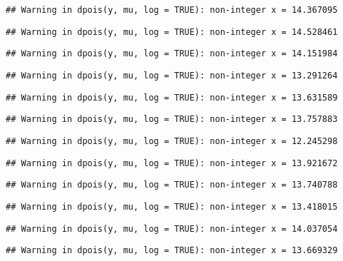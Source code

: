 \documentclass[
]{article}
\begin{document}
\begin{verbatim}
## Warning in dpois(y, mu, log = TRUE): non-integer x = 14.367095
\end{verbatim}

\begin{verbatim}
## Warning in dpois(y, mu, log = TRUE): non-integer x = 14.528461
\end{verbatim}

\begin{verbatim}
## Warning in dpois(y, mu, log = TRUE): non-integer x = 14.151984
\end{verbatim}

\begin{verbatim}
## Warning in dpois(y, mu, log = TRUE): non-integer x = 13.291264
\end{verbatim}

\begin{verbatim}
## Warning in dpois(y, mu, log = TRUE): non-integer x = 13.631589
\end{verbatim}

\begin{verbatim}
## Warning in dpois(y, mu, log = TRUE): non-integer x = 13.757883
\end{verbatim}

\begin{verbatim}
## Warning in dpois(y, mu, log = TRUE): non-integer x = 12.245298
\end{verbatim}

\begin{verbatim}
## Warning in dpois(y, mu, log = TRUE): non-integer x = 13.921672
\end{verbatim}

\begin{verbatim}
## Warning in dpois(y, mu, log = TRUE): non-integer x = 13.740788
\end{verbatim}

\begin{verbatim}
## Warning in dpois(y, mu, log = TRUE): non-integer x = 13.418015
\end{verbatim}

\begin{verbatim}
## Warning in dpois(y, mu, log = TRUE): non-integer x = 14.037054
\end{verbatim}

\begin{verbatim}
## Warning in dpois(y, mu, log = TRUE): non-integer x = 13.669329
\end{verbatim}
\end{document}
